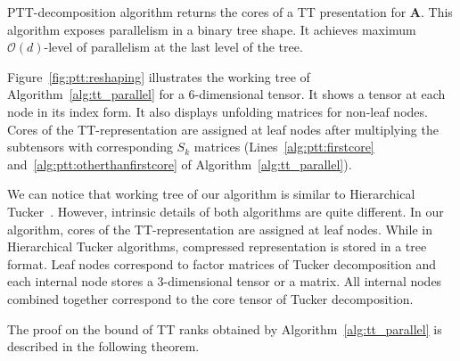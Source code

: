 \documentclass[sigconf]{acmart}
\makeatletter
\newcommand{\tensor}[1]{{\cal\textbf{#1}\xspace}}
\DeclareRobustCommand*\cal{\@fontswitch\relax\mathcal}
\makeatother
\begin{document}
PTT-decomposition algorithm returns the cores of a TT presentation for \tensor{A}. This algorithm exposes parallelism in a binary tree shape. It achieves maximum $\mathcal{O}(d)$-level of parallelism at the last level of the tree.

Figure~\ref{fig:ptt:reshaping} illustrates the working tree of Algorithm~\ref{alg:tt_parallel} for a $6$-dimensional tensor. It shows a tensor at each node in its index form. It also displays unfolding matrices for non-leaf nodes. Cores of the TT-representation are assigned at leaf nodes after multiplying the subtensors with corresponding $S_k$ matrices (Lines~\ref{alg:ptt:firstcore} and~\ref{alg:ptt:otherthanfirstcore} of Algorithm~\ref{alg:tt_parallel}). 

We can notice that working tree of our algorithm is similar to Hierarchical Tucker~\cite{h-tucker-Grasedyck}. However, intrinsic details of both algorithms are quite different. In our algorithm, cores of the TT-representation are assigned at leaf nodes. While in Hierarchical Tucker algorithms, compressed representation is stored in a tree format. Leaf nodes correspond to factor matrices of Tucker decomposition and each internal node stores a $3$-dimensional tensor or a matrix. All internal nodes combined together correspond to the core tensor of Tucker decomposition.

The proof on the bound of TT ranks obtained by Algorithm~\ref{alg:tt_parallel} is described in the following theorem.
\end{document}
